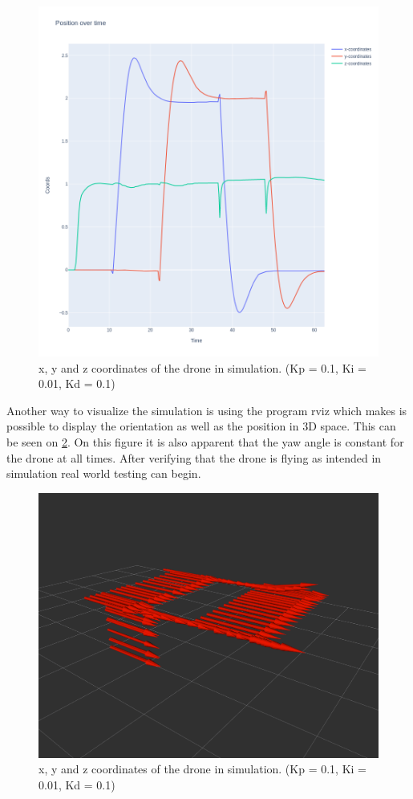 \documentclass[conference]{IEEEtran}
\begin{document}
\begin{figure}[hbtp]
	\centering
	\includegraphics[width=1.0\linewidth]{images/task2_sim_pos.png}
	\caption{x, y and z coordinates of the drone in simulation. (Kp = 0.1, Ki = 0.01, Kd = 0.1)}
	\label{fig:sim_pos}
\end{figure}

Another way to visualize the simulation is using the program rviz which makes is possible to display the orientation as well as the position in 3D space. This can be seen on \cref{fig:sim_rviz}. On this figure it is also apparent that the yaw angle is constant for the drone at all times. 
After verifying that the drone is flying as intended in simulation real world testing can begin.

\begin{figure}[hbtp]
	\centering
	\includegraphics[width=1.0\linewidth]{images/task2_sim_rviz.png}
	\caption{x, y and z coordinates of the drone in simulation. (Kp = 0.1, Ki = 0.01, Kd = 0.1)}
	\label{fig:sim_rviz}
\end{figure}
\end{document}
